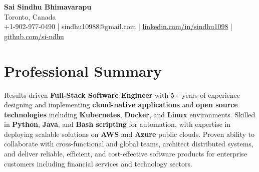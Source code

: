 \documentclass[letterpaper,11pt]{article}
\begin{document}
\begin{center}
  {\Large \textbf{Sai Sindhu Bhimavarapu}} \\
  Toronto, Canada \\
  +1-902-977-0490 \enspace | \enspace sindhu10988@gmail.com \enspace | \enspace \href{https://www.linkedin.com/in/sindhu1098/}{linkedin.com/in/sindhu1098} \enspace | \enspace \href{https://github.com/si-ndhu}{github.com/si-ndhu}
\end{center}

\section{Professional Summary}
  \begin{itemize}[leftmargin=0.15in, label={}]
    \small{\item{
     Results-driven \textbf{Full-Stack Software Engineer} with 5+ years of experience designing and implementing \textbf{cloud-native applications} and \textbf{open source technologies} including \textbf{Kubernetes}, \textbf{Docker}, and \textbf{Linux} environments. Skilled in \textbf{Python}, \textbf{Java}, and \textbf{Bash scripting} for automation, with expertise in deploying scalable solutions on \textbf{AWS} and \textbf{Azure} public clouds. Proven ability to collaborate with cross-functional and global teams, architect distributed systems, and deliver reliable, efficient, and cost-effective software products for enterprise customers including financial services and technology sectors.
    }}
  \end{itemize}
\vspace{-16pt}

\end{document}
